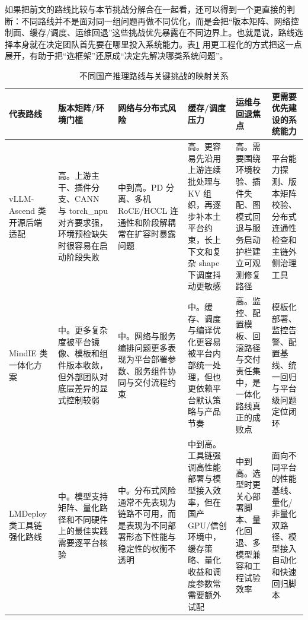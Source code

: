 如果把前文的路线比较与本节挑战分解合在一起看，还可以得到一个更直接的判断：不同路线并不是面对同一组问题再做不同优化，而是会把“版本矩阵、网络控制面、缓存/调度、运维回退”这些挑战优先暴露在不同边界上。也就是说，路线选择本身就在决定团队首先要在哪里投入系统能力。表\ref{tab:route-challenge-mapping} 用更工程化的方式把这一点展开，有助于把“选框架”还原成“决定先解决哪类系统问题”。

\begin{table}[t]
\centering
\footnotesize
\setlength{\tabcolsep}{4pt}
\caption{不同国产推理路线与关键挑战的映射关系}
\label{tab:route-challenge-mapping}
\begin{tabularx}{\textwidth}{>{\raggedright\arraybackslash}p{2.1cm}p{2.8cm}p{2.5cm}p{2.8cm}p{2.8cm}X}
\toprule
代表路线 & 版本矩阵/环境门槛 & 网络与分布式风险 & 缓存/调度压力 & 运维与回退焦点 & 更需要优先建设的系统能力 \\
\midrule
vLLM-Ascend 类开源后端适配 & 高。上游主干、插件分支、CANN 与 torch\_npu 对齐要求强，环境预检缺失时很容易在启动阶段失败\citep{vllmascend,zhihu_vllm_ascend_guide,zhihu_vllm_pd_migration,zhihu_ascend_appliance_mindie_vllm} & 中到高。PD 分离、多机 RoCE/HCCL 连通性和阶段解耦常在扩容时暴露问题\citep{zhihu_vllm_pd_migration,xhs_search_vllm_ascend} & 高。更容易先沿用上游连续批处理与 KV 组织，再逐步补本土平台约束，长上下文和复杂 shape 下调度抖动更敏感 & 高。需要围绕环境校验、插件失配、图模式回退与服务启动护栏建立可观测修复路径 & 平台能力探测、版本矩阵校验、分布式连通性检查和主链外侧治理工具 \\
MindIE 类一体化方案 & 中。更多复杂度被平台镜像、模板和组件版本收敛，但外部团队对底层差异的显式控制较弱\citep{mindie,zhihu_mindie_deploy,zhihu_ascend_appliance_mindie_vllm} & 中。网络与服务编排问题更多表现为平台部署参数、服务组件协同与交付流程约束 & 中。缓存、调度与编译优化更容易被平台内部统一处理，但也更依赖平台默认策略与产品节奏 & 高。监控、配置模板、回滚路径与交付责任集中，是一体化路线真正的成败点\citep{zhihu_mindie_deploy,xhs_search_mindie,xhs_search_domestic_deploy} & 模板化部署、监控告警、配置基线、统一回归与平台级问题定位闭环 \\
LMDeploy 类工具链强化路线 & 中。模型支持矩阵、量化路径和不同硬件上的最佳实践需要逐平台核验\citep{lmdeploy,zhihu_lmdeploy_domestic,xhs_search_lmdeploy} & 中。分布式风险通常不先表现为链路不可用，而是表现为不同部署形态下性能与稳定性的权衡不透明 & 中到高。工具链强调高性能部署与模型接入效率，但在国产 GPU/信创环境中，缓存策略、量化收益和调度参数常需要额外试配 & 中到高。选型时更关心部署脚本、量化回退、多模型兼容和工程试验效率\citep{zhihu_lmdeploy_domestic,xhs_search_lmdeploy,xhs_search_domestic_deploy} & 面向不同平台的性能基线、量化/非量化双路径、模型接入自动化和快速回归脚本 \\

\end{tabularx}
\end{table}
